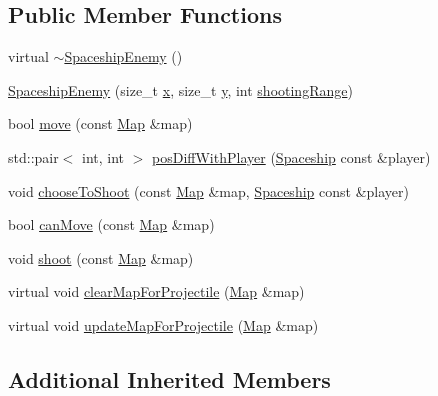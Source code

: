 \subsection*{Public Member Functions}
\begin{DoxyCompactItemize}
\item 
virtual \hyperlink{classarcade_1_1_spaceship_enemy_a7fbb57ede71bf8dde9af2bffc6239bc4}{$\sim$\+Spaceship\+Enemy} ()
\item 
\hyperlink{classarcade_1_1_spaceship_enemy_a1eb27431e53257166ff2c90c8dcf1bc4}{Spaceship\+Enemy} (size\+\_\+t \hyperlink{include_2_protocol_8hpp_a4dde988b1b2adba65ae3efa69f65d960}{x}, size\+\_\+t \hyperlink{include_2_protocol_8hpp_ab0580f504a7428539be299fa71565f30}{y}, int \hyperlink{classarcade_1_1_spaceship_a414281f267135317527aeb86e170d892}{shooting\+Range})
\item 
bool \hyperlink{classarcade_1_1_spaceship_enemy_a62c4ee2725fd8d7496d433bb2ea86603}{move} (const \hyperlink{classarcade_1_1_map}{Map} \&map)
\item 
std\+::pair$<$ int, int $>$ \hyperlink{classarcade_1_1_spaceship_enemy_a6a6b1e32ef2618727bfe01e828a8e4e8}{pos\+Diff\+With\+Player} (\hyperlink{classarcade_1_1_spaceship}{Spaceship} const \&player)
\item 
void \hyperlink{classarcade_1_1_spaceship_enemy_a5b01b4ab0dc3602a1a6f2d93aba67cdd}{choose\+To\+Shoot} (const \hyperlink{classarcade_1_1_map}{Map} \&map, \hyperlink{classarcade_1_1_spaceship}{Spaceship} const \&player)
\item 
bool \hyperlink{classarcade_1_1_spaceship_enemy_a19e3a1d5430307540fba8a649eb06007}{can\+Move} (const \hyperlink{classarcade_1_1_map}{Map} \&map)
\item 
void \hyperlink{classarcade_1_1_spaceship_enemy_ad4963ac1857b42c2497774f77a6d0d05}{shoot} (const \hyperlink{classarcade_1_1_map}{Map} \&map)
\item 
virtual void \hyperlink{classarcade_1_1_spaceship_enemy_a76ad6511c8dba9850fb70a1633f8cc87}{clear\+Map\+For\+Projectile} (\hyperlink{classarcade_1_1_map}{Map} \&map)
\item 
virtual void \hyperlink{classarcade_1_1_spaceship_enemy_acdf6714050c6622c4f67473ec1866404}{update\+Map\+For\+Projectile} (\hyperlink{classarcade_1_1_map}{Map} \&map)
\end{DoxyCompactItemize}
\subsection*{Additional Inherited Members}


